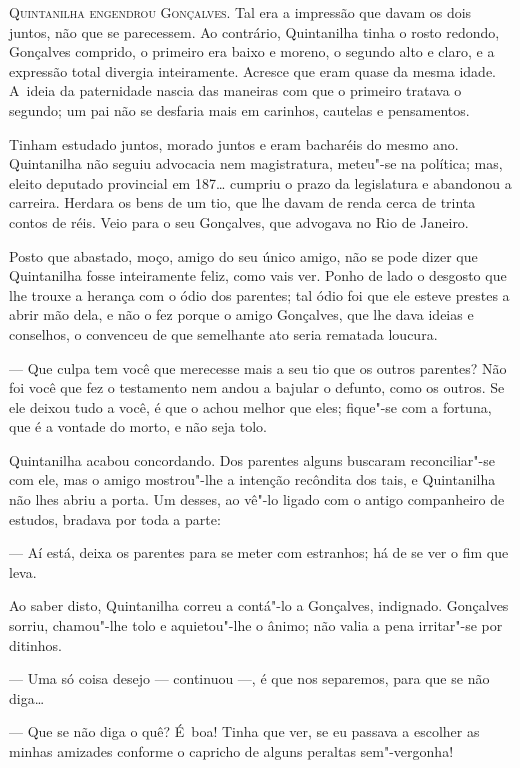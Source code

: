 \begin{linenumbers}

\textsc{Quintanilha engendrou Gonçalves}. Tal era a impressão que davam os dois
juntos, não que se parecessem. Ao contrário, Quintanilha tinha o rosto
redondo, Gonçalves comprido, o primeiro era baixo e moreno, o segundo
alto e claro, e a expressão total divergia inteiramente. Acresce que
eram quase da mesma idade. A~ideia da paternidade nascia das maneiras
com que o primeiro tratava o segundo; um pai não se desfaria mais em
carinhos, cautelas e pensamentos.

Tinham estudado juntos, morado juntos e eram bacharéis do mesmo ano.
Quintanilha não seguiu advocacia nem magistratura, meteu"-se na política;
mas, eleito deputado provincial em 187\ldots{} cumpriu o prazo da legislatura
e abandonou a carreira. Herdara os bens de um tio, que lhe davam de
renda cerca de trinta contos de réis. Veio para o seu Gonçalves, que
advogava no Rio de Janeiro.

Posto que abastado, moço, amigo do seu único amigo, não se pode dizer
que Quintanilha fosse inteiramente feliz, como vais ver. Ponho de lado o
desgosto que lhe trouxe a herança com o ódio dos parentes; tal ódio foi
que ele esteve prestes a abrir mão dela, e não o fez porque o amigo
Gonçalves, que lhe dava ideias e conselhos, o convenceu de que
semelhante ato seria rematada loucura.

--- Que culpa tem você que merecesse mais a seu tio que os outros
parentes? Não foi você que fez o testamento nem andou a bajular o
defunto, como os outros. Se ele deixou tudo a você, é que o achou melhor
que eles; fique"-se com a fortuna, que é a vontade do morto, e não seja
tolo.

Quintanilha acabou concordando. Dos parentes alguns buscaram
reconciliar"-se com ele, mas o amigo mostrou"-lhe a intenção recôndita dos
tais, e Quintanilha não lhes abriu a porta. Um desses, ao vê"-lo ligado
com o antigo companheiro de estudos, bradava por toda a parte:

--- Aí está, deixa os parentes para se meter com estranhos; há de se ver
o fim que leva.

Ao saber disto, Quintanilha correu a contá"-lo a Gonçalves, indignado.
Gonçalves sorriu, chamou"-lhe tolo e aquietou"-lhe o ânimo; não valia a
pena irritar"-se por ditinhos.

--- Uma só coisa desejo --- continuou ---, é que nos separemos, para que se
não diga\ldots{}

--- Que se não diga o quê? É~boa! Tinha que ver, se eu passava a escolher
as minhas amizades conforme o capricho de alguns peraltas sem"-vergonha!


\end{linenumbers}

